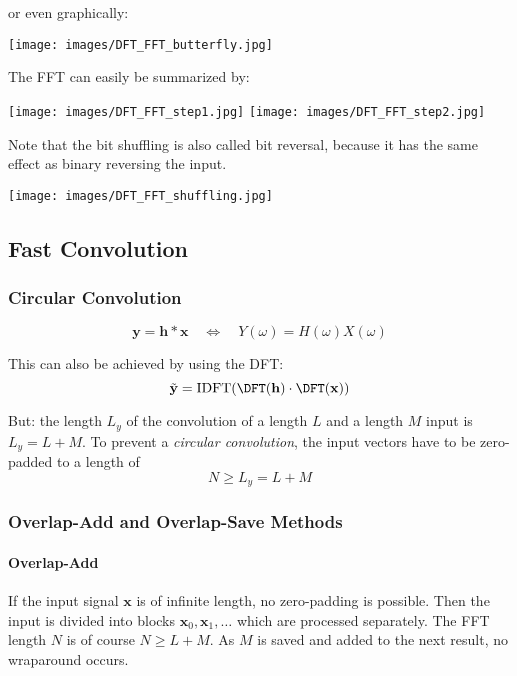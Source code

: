 or even graphically:
\begin{center}
	\texttt{[image: images/DFT\_FFT\_butterfly.jpg]}
\end{center}

The FFT can easily be summarized by:
\begin{center}
	\texttt{[image: images/DFT\_FFT\_step1.jpg]}
	\texttt{[image: images/DFT\_FFT\_step2.jpg]}
\end{center}

Note that the bit shuffling is also called bit reversal, because it has
the same effect as binary reversing the input.
\begin{center}
	\texttt{[image: images/DFT\_FFT\_shuffling.jpg]}
\end{center}

\subsection{Fast Convolution}
\subsubsection{Circular Convolution}

\begin{equation*}
	\mathbf{y} = \mathbf{h} \ast \mathbf{x} \quad\Leftrightarrow\quad Y(\omega) = H(\omega) X(\omega)
\end{equation*}

This can also be achieved by using the DFT:
\begin{equation*}
	\tilde{\mathbf{y}} = \text{IDFT}(\DFT(\mathbf{h}) \cdot \DFT(\mathbf{x}))
\end{equation*}

But: the length $L_y$ of the convolution of a length $L$ and a length $M$
input is $L_y = L + M$. To prevent a \emph{circular convolution}, the
input vectors have to be zero-padded to a length of
\begin{equation*}
	N \geq L_y = L+M
\end{equation*}

\subsubsection{Overlap-Add and Overlap-Save Methods}

\paragraph{Overlap-Add}
If the input signal $\mathbf{x}$ is of infinite length, no zero-padding
is possible. Then the input is divided into blocks
$\mathbf{x}_0, \mathbf{x}_1, \ldots$ which are processed separately.
The FFT length $N$ is of course $N \geq L+M$. As $M$ is saved and added
to the next result, no wraparound occurs.

